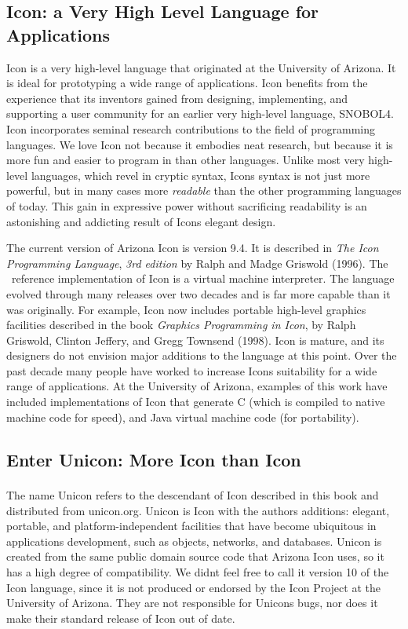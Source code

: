 \subsection{Icon: a Very High Level Language for Applications}
Icon is a very high-level language that
originated at the University of Arizona. It is ideal for prototyping a
wide range of applications. Icon benefits from the experience that its
inventors gained from designing, implementing, and supporting a user
community for an earlier very high-level language,
SNOBOL4. Icon incorporates seminal research
contributions to the field of programming languages. We love Icon not
because it embodies neat research, but because it is more fun and
easier to program in than other languages. Unlike most very high-level
languages, which revel in cryptic syntax, Icon{\textquotesingle}s
syntax is not just more powerful, but in many cases more
\textit{readable} than the other programming languages of today. This
gain in expressive power without sacrificing readability is an
astonishing and addicting result of Icon{\textquotesingle}s elegant
design.

The current version of Arizona Icon is version 9.4. It is described in
\textit{The Icon Programming Language}, \textit{3rd edition} by Ralph
and Madge Griswold (1996). The \ reference implementation of Icon is a
virtual machine interpreter. The language evolved through many releases
over two decades and is far more capable than it was originally. For
example, Icon now includes portable high-level graphics facilities
described in the book \textit{Graphics Programming in Icon}, by Ralph
Griswold, Clinton Jeffery, and Gregg
Townsend (1998). Icon is mature, and its
designers do not envision major additions to the language at this
point. Over the past decade many people have worked to increase
Icon{\textquotesingle}s suitability for a wide range of applications.
At the University of Arizona, examples of this work have included
implementations of Icon that generate C (which is compiled to native
machine code for speed), and Java virtual
machine code (for portability).

\subsection{Enter Unicon: More Icon than Icon}
The name Unicon\textbf{\textsuperscript{ }}refers to the descendant of
Icon described in this book and distributed from unicon.org. Unicon is
Icon with the authors{\textquotesingle} additions: elegant, portable,
and platform-independent facilities that have become ubiquitous in
applications development, such as objects, networks, and databases.
Unicon is created from the same public domain source code that Arizona
Icon uses, so it has a high degree of compatibility. We
didn{\textquotesingle}t feel free to call it version 10 of the Icon
language, since it is not produced or endorsed by the Icon Project at
the University of Arizona. They are not responsible for
Unicon{\textquotesingle}s bugs, nor does it make their standard release
of Icon out of date.

